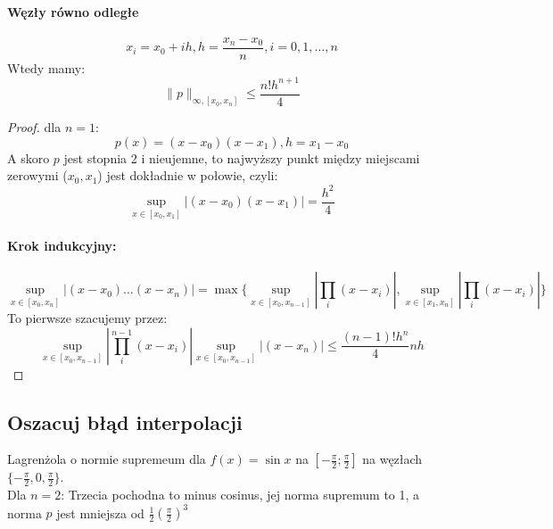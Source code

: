 \documentclass{article}
\begin{document}
\paragraph{Węzły równo odległe}
$$x_i=x_0+ih,h=\frac{x_n-x_0}{n},i=0,1,\dots,n$$
Wtedy mamy:
$$\|p\|_{\infty,[x_0,x_n]}\le \frac{n!h^{n+1}}{4}$$
\begin{proof}
	dla $n = 1$:\\
	$$ p(x)=(x-x_0)(x-x_1),h=x_1-x_0 $$
	A skoro $ p $ jest stopnia 2 i nieujemne, to najwyższy punkt między miejscami zerowymi ($ x_0, x_1 $) jest dokładnie w połowie, czyli:
	$$\sup_{x\in[x_0,x_1]}|(x-x_0)(x-x_1)|=\frac{h^2}{4}$$
	\paragraph{Krok indukcyjny:} $$\sup_{x\in[x_0,x_{n}]}|(x-x_0)\dots(x-x_n)| = \max\{
		\sup_{x\in[x_0,x_{n-1}]}|\prod_{i}(x-x_i)|,
		\sup_{x\in[x_1,x_{n}]}|\prod_{i}(x-x_i)|
	\}$$
	To pierwsze szacujemy przez: 
	$$ \sup_{x\in[x_0,x_{n-1}]}|\prod_{i}^{n-1}(x-x_i)| \sup_{x\in[x_0,x_{n-1}]}|(x-x_n)|\le \frac{(n-1)!h^n}{4}nh$$
\end{proof}
\subsection{Oszacuj błąd interpolacji} Lagrenżola o normie supremeum dla $ f(x)=\sin x $ na $ [-\frac\pi2;\frac\pi2] $ na węzłach $ \{-\frac\pi2,0,\frac\pi2\} $.\\
Dla $n=2$:
Trzecia pochodna to minus cosinus, jej norma supremum to 1, a norma $ p $ jest mniejsza od $ \frac12(\frac\pi2)^3 $
\end{document}
